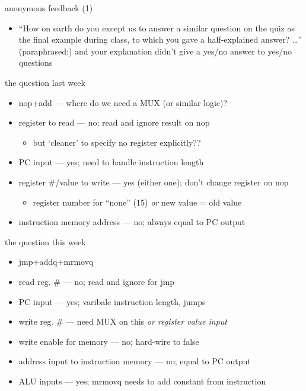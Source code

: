 \begin{frame}{anonymous feedback (1)}
\begin{itemize}
\item 
``How on earth do you except us to answer a similar question on the quiz as the 
final example during class, to which you gave a half-explained answer? \ldots'' (paraphrased:) and your
explanation didn't give a yes/no answer to yes/no questions
\end{itemize}
\end{frame}

\begin{frame}{the question last week}
\begin{itemize}
    \item nop+add --- where do we need a MUX (or similar logic)?
\vspace{.5cm}
\item register to read --- no; read and ignore result on nop
    \begin{itemize}
    \item but `cleaner' to specify no register explicitly??
    \end{itemize}
\item PC input --- yes; need to handle instruction length
\item register \#/value to write --- yes (either one); don't change register on nop
    \begin{itemize}
    \item register number for ``none'' (15) \textit{or} new value = old value
    \end{itemize}
\item instruction memory address --- no; always equal to PC output
\end{itemize}
\end{frame}

\begin{frame}{the question this week}
\begin{itemize}
\item jmp+addq+mrmovq
\vspace{.5cm}
\item read reg. \# --- no; read and ignore for jmp
\item PC input --- yes; varibale instruction length, jumps
\item write reg. \# --- need MUX on this \textit{or register value input}
\item write enable for memory --- no; hard-wire to false
\item address input to instruction memory --- no; equal to PC output
\item ALU inputs --- yes; mrmovq needs to add constant from instruction
\end{itemize}
\end{frame}


